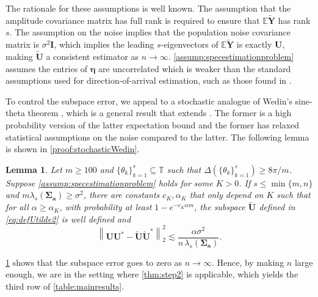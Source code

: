 \documentclass[11pt]{article}
\newtheorem{lemma}[theorem]{Lemma}
\theoremstyle{definition}
\numberwithin{theorem}{section}
\numberwithin{equation}{section}
\def\E{\mathbb{E}}
\def\T{\mathbb{T}}
\renewcommand{\subset}{\subseteq}
\renewcommand{\tilde}{\widetilde}
\newcommand{\bfa}{{\boldsymbol a}}
\newcommand{\bfI}{{\boldsymbol I}}
\newcommand{\bfU}{{\boldsymbol U}}
\newcommand{\bfY}{{\boldsymbol Y}}
\newcommand{\bfeta}{{\boldsymbol \eta}}
\newcommand{\bfSigma}{{\boldsymbol \Sigma}}
\numberwithin{equation}{section}
\begin{document}
The rationale for these assumptions is well known. The assumption that the amplitude covariance matrix has full rank is required to ensure that $\E \tilde \bfY$ has rank $s$. The assumption on the noise implies that the population noise covariance matrix is $\sigma^2 \bfI$, which implies the leading $s$-eigenvectors of $\E \tilde \bfY$ is exactly $\bfU$, making $\tilde \bfU$ a consistent estimator as $n\to\infty$. \cref{assump:specestimationproblem} assumes the entries of $\bfeta$ are uncorrelated which is weaker than the standard assumptions used for direction-of-arrival estimation, such as those found in \cite{stoica1989music}. 

To control the subspace error, we appeal to a stochastic analogue of Wedin's sine-theta theorem \cite[Theorem 6]{dirksen2025subspace}, which is a general result that extends \cite[Theorem 3]{cai2018rate}. The former is a high probability version of the latter expectation bound and the former has relaxed statistical assumptions on the noise compared to the latter. The following lemma is shown in \cref{proof:stochasticWedin}.

\begin{lemma} \label{lem:stochasticWedin}
    Let $m\geq 100$ and $\{\theta_k\}_{k=1}^s\subset\T$ such that $\Delta(\{\theta_k\}_{k=1}^s)\geq 8\pi /m$. Suppose \cref{assump:specestimationproblem} holds for some $K>0$. If $s\leq \min\{m,n\}$ and $m\lambda_s(\bfSigma_{\bfa})\geq \sigma^2$, there are constants $c_K,\alpha_K$ that only depend on $K$ such that for all $\alpha \geq \alpha_K$, with probability at least $1-e^{-c_K \alpha m}$, the subspace $\tilde\bfU$ defined in \eqref{eq:defUtilde2} is well defined and
    $$
    \left\|\bfU\bfU^*- \tilde \bfU \tilde \bfU^* \right\|_2^2
    \lesssim \frac{ \alpha \sigma^2}{n \, \lambda_s(\bfSigma_{\bfa})}.  
    $$
\end{lemma}

\cref{lem:stochasticWedin} shows that the subspace error goes to zero as $n\to\infty$. Hence, by making $n$ large enough, we are in the setting where \cref{thm:step2} is applicable, which yields the third row of \cref{table:mainresults}. 
\end{document}
